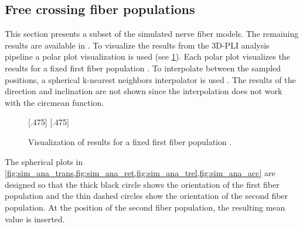 \subsection{Free crossing fiber populations}
\label{sec:resFreeCross}
%
This section presents a subset of the simulated nerve fiber models.
The remaining results are available in \dummy{}.
To visualize the results from the \ac{3D-PLI} analysis pipeline a polar plot visualization is used (see \cref{fig:simModelSphereSample}).
Each polar plot visualizes the results for a fixed first fiber population \popa{}.
To interpolate between the sampled positions, a spherical k-nearest neighbors interpolator is used \cite{DBLP:journals/corr/abs-1910-00704}.
The results of the direction and inclination are not shown since the interpolation does not work with the circmean function.
% 
\begin{figure}[t]
\centering
\setlength{\tikzwidth}{0.40\textwidth}
[.475\textwidth]{}
\hfill
{}
[.475\textwidth]{}
\caption{Visualization of results for a fixed first fiber population \popa{}.}
\label{fig:simModelSphereSample}
\end{figure}
%
The spherical plots in \cref{fig:sim_ana_trans,fig:sim_ana_ret,fig:sim_ana_trel,fig:sim_ana_acc} are designed so that the thick black circle shows the orientation of the first fiber population and the thin dashed circles show the orientation of the second fiber population.
At the position of the second fiber population, the resulting mean value is inserted.
%
%
%
